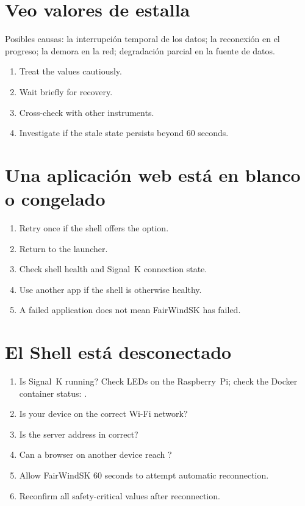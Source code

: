 \section{Veo valores de estalla}

Posibles causas: la interrupción temporal de los datos; la reconexión en el progreso; la demora en la red;
degradación parcial en la fuente de datos.

\begin{enumerate}
  \item Treat the values cautiously.
  \item Wait briefly for recovery.
  \item Cross-check with other instruments.
  \item Investigate if the stale state persists beyond 60 seconds.
\end{enumerate}

\section{Una aplicación web está en blanco o congelado}

\begin{enumerate}
  \item Retry once if the shell offers the option.
  \item Return to the launcher.
  \item Check shell health and Signal~K connection state.
  \item Use another app if the shell is otherwise healthy.
  \item A failed application does not mean FairWindSK has failed.
\end{enumerate}

\section{El Shell está desconectado}

\begin{enumerate}
  \item Is Signal~K running? Check LEDs on the Raspberry~Pi; check the Docker
        container status: .
  \item Is your device on the correct Wi-Fi network?
  \item Is the server address in  correct?
  \item Can a browser on another device reach ?
  \item Allow FairWindSK 60 seconds to attempt automatic reconnection.
  \item Reconfirm all safety-critical values after reconnection.
\end{enumerate}

